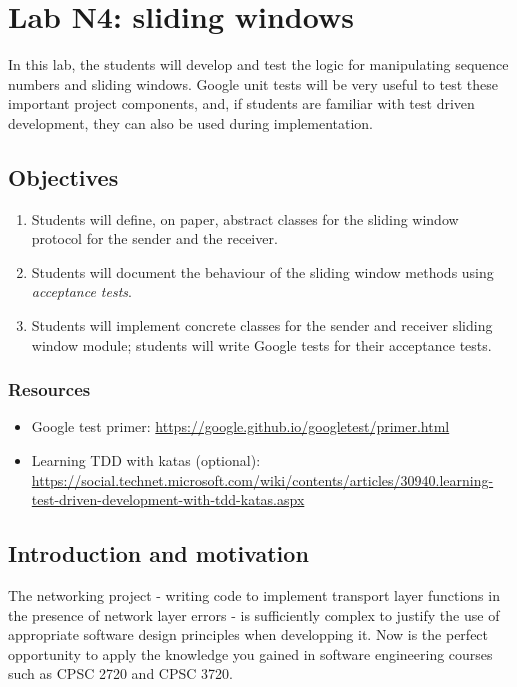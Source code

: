 \documentclass[12pt]{book}
\begin{document}
\chapter{Lab N4: sliding windows}

In this lab, the students will develop and test the logic for manipulating sequence numbers and sliding windows. Google unit tests will be very useful to test these important project components, and, if students are familiar with test driven development, they can also be used during implementation.

\section{Objectives}

\begin{enumerate}[label=Objective \arabic*]
\item\label{pl3.abs} Students will define, on paper, abstract classes for the sliding window protocol for the sender and the receiver.
\item\label{pl3.test} Students will document the behaviour of the sliding window methods using \emph{acceptance tests}.
  \item\label{pl3.impl} Students will implement concrete classes for the sender and receiver sliding window module; students will write Google tests for their acceptance tests.
\end{enumerate}

\subsection{Resources}

\begin{itemize}[label=--]
\item Google test primer: \url{https://google.github.io/googletest/primer.html}
\item Learning TDD with katas (optional): \url{https://social.technet.microsoft.com/wiki/contents/articles/30940.learning-test-driven-development-with-tdd-katas.aspx}
\end{itemize}


\section{Introduction and motivation}


The networking project - writing code to implement transport layer functions in the presence of network layer errors - is sufficiently complex to justify the use of appropriate software design principles when developping it. Now is the perfect opportunity to apply the knowledge you gained in software engineering courses such as CPSC 2720 and CPSC 3720.
\end{document}
